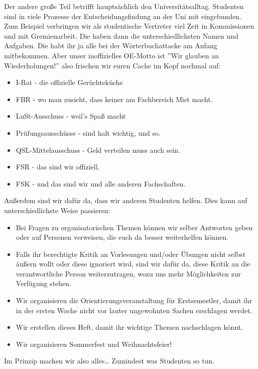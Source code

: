     Der andere große Teil betrifft haupts\"achlich den Universit\"atsalltag.
    Studenten sind in viele Prozesse der Entscheidungsfindung an der Uni
    mit eingebunden.
    Zum Beispiel verbringen wir als studentische Vertreter viel Zeit in Kommissionen und mit Gremienarbeit.
    Die haben dann die unterschiedlichsten Namen und Aufgaben.
    Die habt ihr ja alle bei der W\"orterbuchattacke am Anfang mitbekommen.
    Aber unser inoffizielles OE-Motto ist ''Wir glauben an Wiederholungen!'' also frischen wir euren Cache im Kopf nochmal auf:
    \begin{itemize}
        \item I-Rat - die offizielle Ger\"uchtek\"uche
        \item FBR - wo man zusieht, dass keiner am Fachbereich Mist macht.
        \item LuSt-Ausschuss - weil's Spa{\ss} macht
        \item Prüfungsausschüsse - sind halt wichtig, und so.
        \item QSL-Mittelausschuss - Geld verteilen muss auch sein.
        \item FSR - das sind wir offiziell.
        \item FSK - und das sind wir und alle anderen Fachschaften.
    \end{itemize}
    Au{\ss}erdem sind wir daf\"ur da, dass wir anderen Studenten helfen. Dies kann auf unterschiedlichste Weise passieren:
    \begin{itemize}
        \item Bei Fragen zu organisatorischen Themen können wir selber Antworten geben oder auf Personen verweisen, die euch da besser weiterhelfen können.
        \item Falls ihr berechtigte Kritik an Vorlesungen und/oder Übungen nicht selbst äußern wollt oder diese ignoriert wird, sind wir dafür da, diese Kritik an die verantwortliche Person weiterzutragen, wozu uns mehr Möglichkeiten zur Verfügung stehen.
        \item Wir organisieren die Orientierungsveranstaltung für Erstsemestler, damit ihr in der ersten Woche nicht vor lauter ungewohnten Sachen erschlagen werdet.
        \item Wir erstellen dieses Heft, damit ihr wichtige Themen nachschlagen könnt.
        \item Wir organisieren Sommerfest und Weihnachtsfeier!
    \end{itemize}
    Im Prinzip machen wir also alles\dots\hspace{1cm} Zumindest was Studenten so tun.




